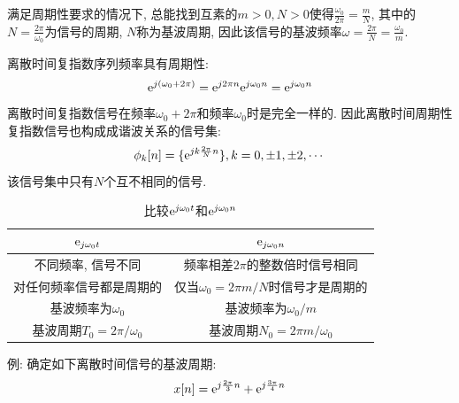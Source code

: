             满足周期性要求的情况下, 总能找到互素的$m>0, N>0$使得$\frac{\omega_0}{2\pi}=\frac{m}{N}$, 其中的$N=\frac{2\pi}{\omega_0}$为信号的周期, $N$称为基波周期, 因此该信号的基波频率$\omega=\frac{2\pi}{N}=\frac{\omega_0}{m}$.

            离散时间复指数序列频率具有周期性:
            \[\mathrm{e}^{j(\omega_0+2\pi)}=\mathrm{e}^{j2\pi n}\mathrm{e}^{j\omega_0n}=\mathrm{e}^{j\omega_0n}\]
            离散时间复指数信号在频率$\omega_0+2\pi$和频率$\omega_0$时是完全一样的. 因此离散时间周期性复指数信号也构成成谐波关系的信号集:
            \[\phi_k[n]=\{\mathrm{e}^{jk\frac{2\pi}{N}n}\}, k=0, \pm1, \pm2, \cdots\]
            该信号集中只有$N$个互不相同的信号.

            \begin{table}[h]\centering
                \caption{比较$\mathrm{e}^{j\omega_0t}$和$\mathrm{e}^{j\omega_0n}$}
                \label{tab:2:comparing-ct-dt}
                \begin{tabular}{cc}\toprule
                    \bf $\mathrm{e}_{j\omega_0t}$ & \bf $\mathrm{e}_{j\omega_0n}$ \\ \midrule
                    不同频率, 信号不同 & 频率相差$2\pi$的整数倍时信号相同 \\
                    对任何频率信号都是周期的 & 仅当$\omega_0=2\pi m/N$时信号才是周期的 \\
                    基波频率为$\omega_0$ & 基波频率为$\omega_0/m$ \\
                    基波周期$T_0=2\pi/\omega_0$ & 基波周期$N_0=2\pi m/\omega_0$ \\
                    \bottomrule
                \end{tabular}
            \end{table}

            例: 确定如下离散时间信号的基波周期:
            \[x[n]=\mathrm{e}^{j\frac{2\pi}{3}n}+\mathrm{e}^{j\frac{3\pi}{4}n}\]

